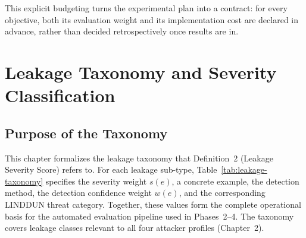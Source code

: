 \documentclass[12pt, a4paper]{report}
\begin{document}
This explicit budgeting turns the experimental plan into a contract: for
every objective, both its evaluation weight and its implementation cost
are declared in advance, rather than decided retrospectively once results
are in.


\chapter{Leakage Taxonomy and Severity Classification}

\section{Purpose of the Taxonomy}

This chapter formalizes the leakage taxonomy that Definition~2
(Leakage Severity Score) refers to. For each leakage sub-type,
Table~\ref{tab:leakage-taxonomy} specifies the severity weight $s(e)$, a
concrete example, the detection method, the detection confidence weight
$w(e)$, and the corresponding LINDDUN threat category. Together, these
values form the complete operational basis for the automated evaluation
pipeline used in Phases~2--4. The taxonomy covers leakage classes
relevant to all four attacker profiles (Chapter~2).

\vspace{0.4cm}
\end{document}
